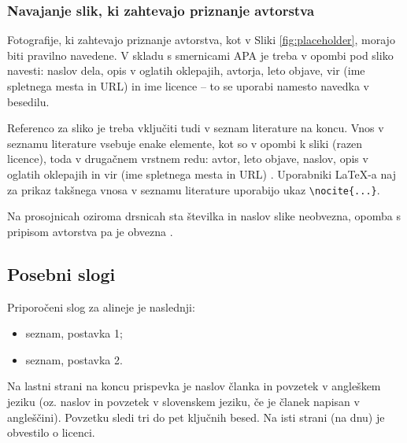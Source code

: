 \documentclass{article}
\begin{document}
\subsubsection{Navajanje slik, ki zahtevajo priznanje avtorstva}

Fotografije, ki zahtevajo priznanje avtorstva, kot v Sliki \ref{fig:placeholder}, morajo biti pravilno navedene. V skladu s smernicami APA \parencite{apa-clipart} je treba v opombi pod sliko navesti: naslov dela, opis v oglatih oklepajih, avtorja, leto objave, vir (ime spletnega mesta in URL) in ime licence \parencite{apa-clipart} -- to se uporabi namesto navedka v besedilu.

Referenco za sliko je treba vključiti tudi v seznam literature na koncu. Vnos v seznamu literature vsebuje enake elemente, kot so v opombi k sliki (razen licence), toda v drugačnem vrstnem redu: avtor, leto objave, naslov, opis v oglatih oklepajih in vir (ime spletnega mesta in URL) \parencite{apa-clipart}. Uporabniki LaTeX-a naj za prikaz takšnega vnosa v seznamu literature uporabijo ukaz \verb|\nocite{...}|.

Na prosojnicah oziroma drsnicah sta številka in naslov slike neobvezna, opomba s pripisom avtorstva pa je obvezna \parencite{apa-clipart}.

\subsection{Posebni slogi}

Priporočeni slog za alineje je naslednji:
\begin{itemize}
    \item seznam, postavka 1;
    \item seznam, postavka 2.
\end{itemize}







\printbibliography


\newpage
{}
\begin{abstracteng}
Na lastni strani na koncu prispevka je naslov članka in povzetek v angleškem jeziku (oz. naslov in povzetek v slovenskem jeziku, če je članek napisan v angleščini). Povzetku sledi tri do pet ključnih besed. Na isti strani (na dnu) je obvestilo o licenci.
\end{abstracteng}

\end{document}
